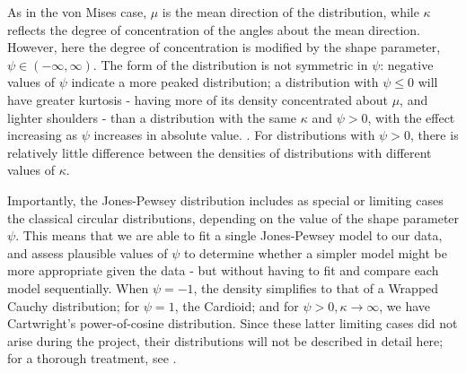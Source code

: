 \documentclass[../../ArchStats.tex]{subfiles}
\begin{document}
As in the von Mises case, $\mu$ is the mean direction of the distribution, while $\kappa$ reflects the degree of concentration of the angles about the mean direction. However, here the degree of concentration is modified by the shape parameter, $\psi \in (-\infty, \infty)$. The form of the distribution is not symmetric in $\psi$: negative values of $\psi$ indicate a more peaked distribution; a distribution with $\psi \leq 0$ will have greater kurtosis - having more of its density concentrated about $\mu$, and lighter shoulders - than a distribution with the same $\kappa$ and $\psi > 0$, with the effect increasing as $\psi$ increases in absolute value. . For distributions with $\psi > 0$, there is relatively little difference between the densities of distributions with different values of $\kappa$.

Importantly, the Jones-Pewsey distribution includes as special or limiting cases the classical circular distributions, depending on the value of the shape parameter $\psi$. This means that we are able to fit a single Jones-Pewsey model to our data, and assess plausible values of $\psi$ to determine whether a simpler model might be more appropriate given the data - but without having to fit and compare each model sequentially.  When $\psi = -1$, the density simplifies to that of a Wrapped Cauchy distribution; for $\psi = 1$, the Cardioid; and for $\psi > 0, \kappa \rightarrow \infty$, we have Cartwright's power-of-cosine distribution. Since these latter limiting cases did not arise during the project, their distributions will  not be described in detail here; for a thorough treatment, see \cite{Jones2005}. 

\end{document}
